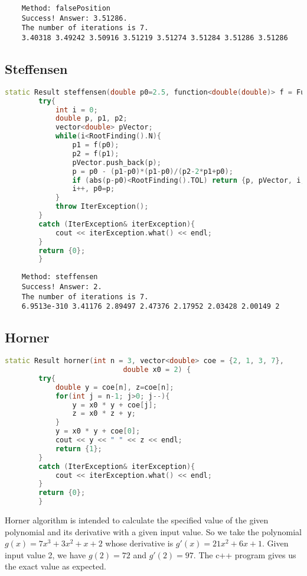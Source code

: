 \documentclass{article}
\begin{document}
\begin{lstlisting}
    Method: falsePosition
    Success! Answer: 3.51286.
    The number of iterations is 7.
    3.40318 3.49242 3.50916 3.51219 3.51274 3.51284 3.51286 3.51286
\end{lstlisting}

\subsection{Steffensen}
\begin{lstlisting}[language=c++]
static Result steffensen(double p0=2.5, function<double(double)> f = Function::f){
        try{
            int i = 0;
            double p, p1, p2;
            vector<double> pVector;
            while(i<RootFinding().N){
                p1 = f(p0);
                p2 = f(p1);
                pVector.push_back(p);
                p = p0 - (p1-p0)*(p1-p0)/(p2-2*p1+p0);
                if (abs(p-p0)<RootFinding().TOL) return {p, pVector, i, "steffensen"};
                i++, p0=p;
            }
            throw IterException();
        }
        catch (IterException& iterException){
            cout << iterException.what() << endl;
        }
        return {0};
        }
\end{lstlisting}

\begin{lstlisting}
    Method: steffensen
    Success! Answer: 2.
    The number of iterations is 7.
    6.9513e-310 3.41176 2.89497 2.47376 2.17952 2.03428 2.00149 2
\end{lstlisting}

\subsection{Horner}

\begin{lstlisting}[language=c++]
static Result horner(int n = 3, vector<double> coe = {2, 1, 3, 7},
                            double x0 = 2) {
        try{
            double y = coe[n], z=coe[n];
            for(int j = n-1; j>0; j--){
                y = x0 * y + coe[j];
                z = x0 * z + y;
            }
            y = x0 * y + coe[0];
            cout << y << " " << z << endl;
            return {1};
        }
        catch (IterException& iterException){
            cout << iterException.what() << endl;
        }
        return {0};
        }
\end{lstlisting}

Horner algorithm is intended to calculate the specified value of the given polynomial and its derivative with a given input value. So we take the polynomial $g(x)=7x^3+3x^2+x+2$ whose derivative is $g'(x)=21x^2+6x+1$. Given input value 2, we have $g(2)=72$ and $g'(2)=97$. The c++ program gives us the exact value as expected.
\end{document}
